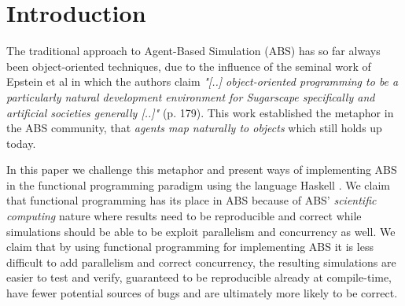 \section{Introduction}
The traditional approach to Agent-Based Simulation (ABS) has so far always been object-oriented techniques, due to the influence of the seminal work of Epstein et al \cite{epstein_growing_1996} in which the authors claim \textit{"[..] object-oriented programming to be a particularly natural development environment for Sugarscape specifically and artificial societies generally [..]"} (p. 179). This work established the metaphor in the ABS community, that \textit{agents map naturally to objects} \cite{north_managing_2007} which still holds up today.

In this paper we challenge this metaphor and present ways of implementing ABS in the functional programming paradigm using the language Haskell \cite{hudak_history_2007}. We claim that functional programming has its place in ABS because of ABS' \textit{scientific computing} nature where results need to be reproducible and correct while simulations should be able to be exploit parallelism and concurrency as well. %
We claim that by using functional programming for implementing ABS it is less difficult to add parallelism and correct concurrency, the resulting simulations are easier to test and verify, guaranteed to be reproducible already at compile-time, have fewer potential sources of bugs and are ultimately more likely to be correct. 

